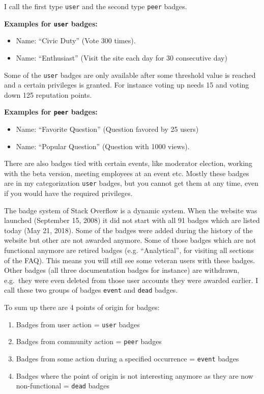 \documentclass[]{book}
\providecommand{\tightlist}{%
  \setlength{\itemsep}{0pt}\setlength{\parskip}{0pt}}
\theoremstyle{definition}
\theoremstyle{definition}
\theoremstyle{definition}
\theoremstyle{remark}
\begin{document}
I call the first type \texttt{user} and the second type \texttt{peer}
badges.

\textbf{Examples for \texttt{user} badges:}

\begin{itemize}
\tightlist
\item
  Name: ``Civic Duty'' (Vote 300 times).
\item
  Name: ``Enthusiast'' (Visit the site each day for 30 consecutive day)
\end{itemize}

Some of the \texttt{user} badges are only available after some threshold
value is reached and a certain privileges is granted. For instance
voting up needs 15 and voting down 125 reputation points.

\textbf{Examples for \texttt{peer} badges:}

\begin{itemize}
\tightlist
\item
  Name: ``Favorite Question'' (Question favored by 25 users)
\item
  Name: ``Popular Question'' (Question with 1000 views).
\end{itemize}

There are also badges tied with certain events, like moderator election,
working with the beta version, meeting employees at an event etc. Mostly
these badges are in my categorization \texttt{user} badges, but you
cannot get them at any time, even if you would have the required
privileges.

The badge system of Stack Overflow is a dynamic system. When the website
was launched (September 15, 2008) it did not start with all 91 badges
which are listed today (May 21, 2018). Some of the badges were added
during the history of the website but other are not awarded anymore.
Some of those badges which are not functional anymore are retired badges
(e.g. ``Analytical'', for visiting all sections of the FAQ). This means
you will still see some veteran users with these badges. Other badges
(all three documentation badges for instance) are withdrawn, e.g.~they
were even deleted from those user accounts they were awarded earlier. I
call these two groups of badges \texttt{event} and \texttt{dead} badges.

To sum up there are 4 points of origin for badges:

\begin{enumerate}
\def\labelenumi{\arabic{enumi})}
\tightlist
\item
  Badges from user action = \texttt{user} badges
\item
  Badges from community action = \texttt{peer} badges
\item
  Badges from some action during a specified occurrence = \texttt{event}
  badges
\item
  Badges where the point of origin is not interesting anymore as they
  are now non-functional = \texttt{dead} badges
\end{enumerate}
\end{document}
